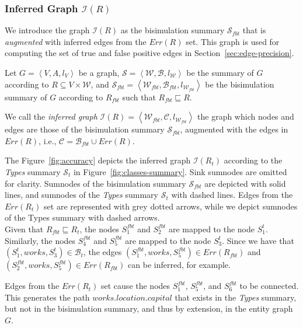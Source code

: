\subsubsection{Inferred Graph $\mathcal{I}(R)$}

We introduce the graph $\mathcal{I}(R)$ as the bisimulation summary $\mathcal{S}_{fbt}$ that is \emph{augmented} with inferred edges from the $Err(R)$ set. This graph is used for computing the set of true and false positive edges in Section~\ref{sec:edge-precision}.

\begin{definition}
Let $G=\left\langle V, A, l_V \right\rangle$ be a graph, $\mathcal{S} = \left\langle \mathcal{W}, \mathcal{B}, l_{\mathcal{W}} \right\rangle$ be the summary of $G$ according to $R \subseteq V \times \mathcal{W}$, and $\mathcal{S}_{fbt} = \left\langle \mathcal{W}_{fbt}, \mathcal{B}_{fbt}, l_{\mathcal{W}_{fbt}} \right\rangle$ be the bisimulation summary of $G$ according to $R_{fbt}$ such that $R_{fbt} \sqsubseteq R$.

We call the \emph{inferred graph} $\mathcal{I}(R) = \left\langle \mathcal{W}_{fbt}, \mathcal{C}, l_{\mathcal{W}_{fbt}} \right\rangle$ the graph which nodes and edges are those of the bisimulation summary $\mathcal{S}_{fbt}$, augmented with the edges in $Err(R)$, i.e., $\mathcal{C} = \mathcal{B}_{fbt} \cup Err(R)$.
\end{definition}

The Figure~\ref{fig:accuracy} depicts the inferred graph $\mathcal{I}(R_t)$ according to the \emph{Types} summary $\mathcal{S}_t$ in Figure~\ref{fig:classes-summary}.
Sink sumnodes are omitted for clarity. Sumnodes of the bisimulation summary $\mathcal{S}_{fbt}$ are depicted with solid lines, and sumnodes of the \emph{Types} summary $\mathcal{S}_t$ with dashed lines. Edges from the $Err(R_t)$ set are represented with grey dotted arrows, while we depict sumnodes of the Types summary with dashed arrows.\\

Given that $R_{fbt} \sqsubseteq R_t$, the nodes $S^{fbt}_1$ and $S^{fbt}_2$ are mapped to the node $S^t_1$. Similarly, the nodes $S^{fbt}_4$ and $S^{fbt}_5$ are mapped to the node $S^t_3$. Since we have that $(S^t_1, works, S^t_3) \in \mathcal{B}_t$, the edges $(S^{fbt}_1, works, S^{fbt}_5) \in Err(R_{fbt})$ and $(S^{fbt}_2, works, S^{fbt}_5) \in Err(R_{fbt})$ can be inferred, for example.

Edges from the $Err(R_t)$ set cause the nodes $S^{fbt}_1$, $S^{fbt}_5$, and $S^{fbt}_6$ to be connected. This generates the path $works.location.capital$ that exists in the \emph{Types} summary, but not in the bisimulation summary, and thus by extension, in the entity graph $G$.

